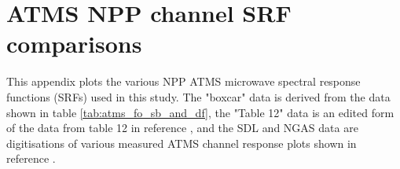 \section{ATMS NPP channel SRF comparisons}
\label{app:srf}
This appendix plots the various NPP ATMS microwave spectral response functions (SRFs) used in this study. The "boxcar" data is derived from the data shown in table \ref{tab:atms_fo_sb_and_df}, the "Table 12" data is an edited form of the data from table 12 in reference \cite{ATMS_PFM_CalLog}, and the SDL \cite{ATMS_SRF_SDL} and NGAS \cite{ATMS_SRF_NGAS} data are digitisations of various measured ATMS channel response plots shown in reference \cite{ATMS_PFM_CalLog}.

\clearpage


